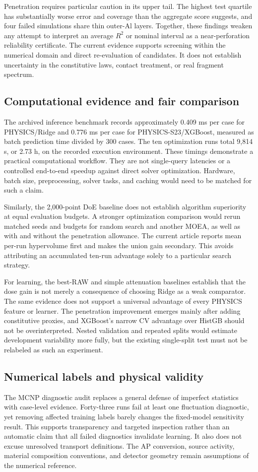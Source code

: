 \documentclass[12pt]{elsarticle}
\begin{document}
Penetration requires particular caution in its upper tail. The highest test quartile has substantially worse error and coverage than the aggregate score suggests, and four failed simulations share thin outer-Al layers. Together, these findings weaken any attempt to interpret an average $R^2$ or nominal interval as a near-perforation reliability certificate. The current evidence supports screening within the numerical domain and direct re-evaluation of candidates. It does not establish uncertainty in the constitutive laws, contact treatment, or real fragment spectrum.

\subsection{Computational evidence and fair comparison}
The archived inference benchmark records approximately 0.409 ms per case for PHYSICS/Ridge and 0.776 ms per case for PHYSICS-S23/XGBoost, measured as batch prediction time divided by 300 cases. The ten optimization runs total 9,814 s, or 2.73 h, on the recorded execution environment. These timings demonstrate a practical computational workflow. They are not single-query latencies or a controlled end-to-end speedup against direct solver optimization. Hardware, batch size, preprocessing, solver tasks, and caching would need to be matched for such a claim.

Similarly, the 2,000-point DoE baseline does not establish algorithm superiority at equal evaluation budgets. A stronger optimization comparison would rerun matched seeds and budgets for random search and another MOEA, as well as with and without the penetration allowance. The current article reports mean per-run hypervolume first and makes the union gain secondary. This avoids attributing an accumulated ten-run advantage solely to a particular search strategy.

For learning, the best-RAW and simple attenuation baselines establish that the dose gain is not merely a consequence of choosing Ridge as a weak comparator. The same evidence does not support a universal advantage of every PHYSICS feature or learner. The penetration improvement emerges mainly after adding constitutive proxies, and XGBoost's narrow CV advantage over HistGB should not be overinterpreted. Nested validation and repeated splits would estimate development variability more fully, but the existing single-split test must not be relabeled as such an experiment.

\subsection{Numerical labels and physical validity}
The MCNP diagnostic audit replaces a general defense of imperfect statistics with case-level evidence. Forty-three runs fail at least one fluctuation diagnostic, yet removing affected training labels barely changes the fixed-model sensitivity result. This supports transparency and targeted inspection rather than an automatic claim that all failed diagnostics invalidate learning. It also does not excuse unresolved transport definitions. The AP conversion, source activity, material composition conventions, and detector geometry remain assumptions of the numerical reference.
\end{document}
